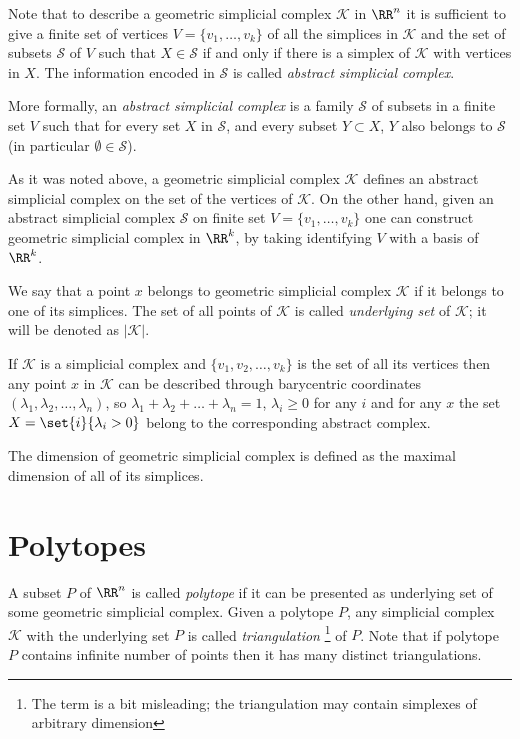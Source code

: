 Note that to describe a geometric simplicial complex $\mathcal{K}$ in $\RR^n$ 
it is sufficient to give a finite set of vertices $V=\{v_1,\dots, v_k\}$ of all the simplices in $\mathcal{K}$
and the set of subsets $\mathcal{S}$ of $V$ 
such that $X\in \mathcal{S}$ if and only if there is a simplex of $\mathcal{K}$ with vertices in $X$.
The information encoded in $\mathcal{S}$ is called \emph{abstract simplicial complex}.

More formally, an \emph{abstract simplicial complex} 
is a family $\mathcal{S}$ of subsets in a finite set $V$
such that for every set $X$ in $\mathcal{S}$, 
and every subset $Y\subset  X$, 
$Y$ also belongs to $\mathcal{S}$
(in particular $\emptyset\in\mathcal{S}$).

As it was noted above, 
a geometric simplicial complex $\mathcal{K}$
defines an abstract simplicial complex on the set of the vertices of $\mathcal{K}$.
On the other hand, 
given an abstract simplicial complex $\mathcal{S}$ on finite set $V=\{v_1,\dots, v_k\}$ 
one can construct geometric simplicial complex
in $\RR^k$, by taking identifying $V$ with a  basis of $\RR^k$.

We say that a point $x$ belongs to geometric simplicial complex $\mathcal{K}$ if it belongs to one of its simplices.
The set of all points of  $\mathcal{K}$ is called \emph{underlying set} of $\mathcal{K}$;
it will be denoted as $|\mathcal{K}|$.

If $\mathcal{K}$ is a simplicial complex
and $\{v_1,v_2,\dots,v_k\}$ is the set of all its vertices
then any point $x$ in $\mathcal{K}$ can be described 
through barycentric coordinates $(\lambda_1,\lambda_2,\dots,\lambda_n)$, so $\lambda_1+\lambda_2+\dots+\lambda_n=1$,
$\lambda_i\ge 0$ for any $i$ and 
for any $x$ the set $X=\set{i}{\lambda_i>0}$
belong to the corresponding abstract complex. 

The dimension  of geometric simplicial complex is defined as the maximal dimension of all of its simplices.

\section*{Polytopes}

A subset $P$ of $\RR^n$ is called \emph{polytope} if it can be presented as 
underlying set of some geometric simplicial complex.
Given a polytope $P$,
any simplicial complex $\mathcal{K}$ with the underlying set $P$ is called \emph{triangulation}%
\footnote{The term is a bit misleading; 
the triangulation may contain simplexes of arbitrary dimension}
of $P$.
Note that if polytope $P$ contains infinite number of points then it has many distinct triangulations.

